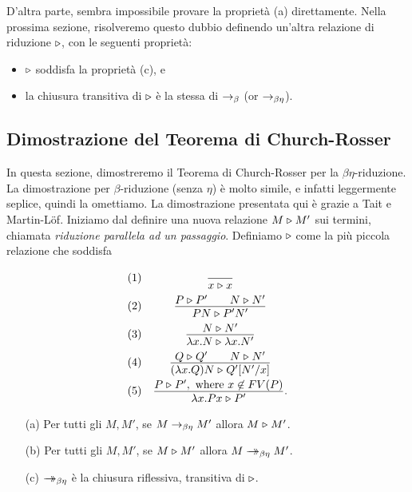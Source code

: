 \documentclass{article}
\begin{document}
D'altra parte, sembra impossibile provare la propriet\`a (a) direttamente.
Nella prossima sezione, risolveremo questo dubbio definendo
un'altra relazione di riduzione $\mathrel{\triangleright}$, con le seguenti propriet\`a:
\begin{itemize}
\item $\mathrel{\triangleright}$ soddisfa la propriet\`a (c), e
\item la chiusura transitiva di $\mathrel{\triangleright}$ \`e la stessa di $\rightarrow_{\beta}$
  (or $\rightarrow_{\beta\eta}$).
\end{itemize}

\subsection{Dimostrazione del Teorema di Church-Rosser}
\label{subsec-proof-cr}

In questa sezione, dimostreremo il Teorema di Church-Rosser per la
$\beta\eta$-riduzione. La dimostrazione per $\beta$-riduzione (senza
$\eta$) \`e molto simile, e infatti leggermente seplice, quindi
la omettiamo. La dimostrazione presentata qui \`e grazie a Tait e Martin-L\"of. Iniziamo
dal definire una nuova relazione $M\mathrel{\triangleright} M'$ sui termini, chiamata {\em
 riduzione parallela ad un passaggio}. Definiamo $\mathrel{\triangleright}$ come la pi\`u
piccola relazione che soddisfa
\[ \begin{array}{lc}
  (1) & \deriv{}{x\tri x} \nl
  (2) & \deriv{P \tri P' \sep N \tri N'}{PN \tri P'N'} \nl
  (3) & \deriv{N \tri N'}{\lam x.N \tri \lam x.N'} \nl
  (4) & \deriv{Q \tri Q' \sep N \tri N'}{(\lam x.Q)N \tri \subst{Q'}{N'}{x}}
  \nl
  (5) & \deriv{P \tri P',\mbox{ where $x\not\in\FV{P}$}}{\lam x.Px
    \tri P'}.
\end{array}
\]

\begin{lemma}\label{lem-tri-redbes}
  \begin{enumerate}
  \item[(a)] Per tutti gli $M,M'$, se $M\rightarrow_{\beta\eta} M'$ allora $M\mathrel{\triangleright} M'$.
  \item[(b)] Per tutti gli $M,M'$, se $M\mathrel{\triangleright} M'$ allora $M\mathrel{\rightarrow\!\!\!\!\!\rightarrow}_{\beta\eta} M'$.
  \item[(c)] $\mathrel{\rightarrow\!\!\!\!\!\rightarrow}_{\beta\eta}$ \`e la chiusura riflessiva, transitiva di $\mathrel{\triangleright}$.
  \end{enumerate}
\end{lemma}
\end{document}
